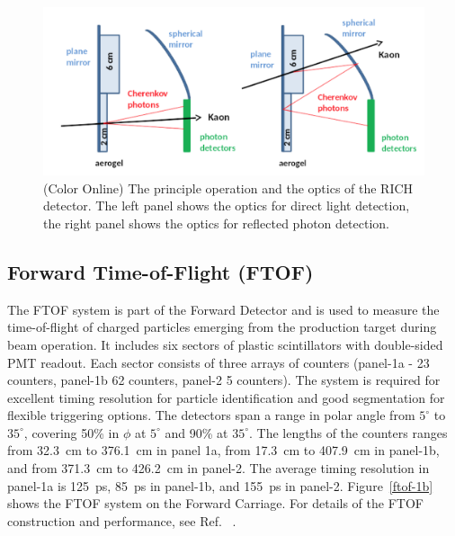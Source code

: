 \documentclass[final,3p,twocolumn]{elsarticle}
\begin{document}
\begin{figure}[htbp!]
\includegraphics[width=2.0\columnwidth]{rich.png}
\caption{(Color Online) The principle operation and the optics of the
RICH detector. The left panel shows the optics for direct light detection, the right panel shows the optics for reflected photon detection.}
\label{rich}
\end{figure}

\subsection{Forward Time-of-Flight (FTOF)}
\label{ftof}

The FTOF system is part of the Forward Detector and is used to measure the time-of-flight of charged particles 
emerging from the production target during beam operation. It includes six sectors of plastic scintillators with 
double-sided PMT readout. Each sector consists of three arrays of counters (panel-1a - 23 counters, panel-1b 62
counters, panel-2 5 counters). The system is required for excellent timing resolution for particle identification and
good segmentation for flexible triggering options. The detectors span a range in polar angle from $5^\circ$ to
$35^\circ$, covering 50\% in $\phi$ at $5^\circ$ and 90\% at $35^\circ$. The lengths of the counters ranges from
32.3~cm to 376.1~cm in panel 1a, from 17.3~cm to 407.9~cm in panel-1b, and from 371.3~cm to 426.2~cm in panel-2.
The average timing resolution in panel-1a is 125~ps, 85~ps in panel-1b, and 155~ps in panel-2. Figure~\ref{ftof-1b}
shows the FTOF system on the Forward Carriage. For details of the FTOF construction and performance, see
Ref. ~\cite{FTOF}. 
\end{document}
